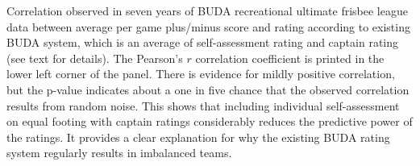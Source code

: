 Correlation observed in seven years of BUDA recreational ultimate frisbee league data between average per game plus/minus score and rating according to existing BUDA system, which is an average of self-assessment rating and captain rating (see text for details). The Pearson's $r$ correlation coefficient is printed in the lower left corner of the panel. There is evidence for mildly positive correlation, but the p-value indicates about a one in five chance that the observed correlation results from random noise.  This shows that including individual self-assessment on equal footing with captain ratings considerably reduces the predictive power of the ratings. It provides a clear explanation for why the existing BUDA rating system regularly results in imbalanced teams. \label{fig:correlation_buda}